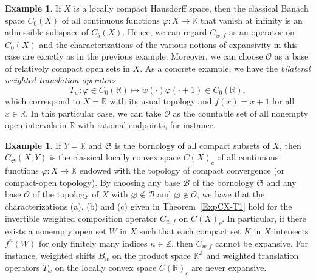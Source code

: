 \documentclass[12pt]{article}
\theoremstyle{plain}
\theoremstyle{definition}
\newtheorem{example}[theorem]{Example}%
\newcommand{\Z}{\mathbb{Z}} %
\newcommand{\R}{\mathbb{R}} %
\newcommand{\K}{\mathbb{K}} %
\newcommand{\cB}{\mathcal{B}}
\newcommand{\cO}{\mathcal{O}}
\newcommand{\fS}{\mathfrak{S}}
\begin{document}
\begin{example}\label{ExpCX-Ex2}
If $X$ is a locally compact Hausdorff space, then the classical Banach space $C_0(X)$ of all continuous functions 
$\varphi : X \to \K$ that vanish at infinity is an admissible subspace of $C_b(X)$.
Hence, we can regard $C_{w,f}$ as an operator on $C_0(X)$ and the characterizations of the various notions of expansivity
in this case are exactly as in the previous example. 
Moreover, we can choose $\cO$ as a base of relatively compact open sets in $X$.
As a concrete example, we have the {\em bilateral weighted translation operators}
\[
T_w : \varphi \in C_0(\R) \mapsto w(\cdot) \varphi(\cdot + 1) \in C_0(\R),
\]
which correspond to $X = \R$ with its usual topology and $f(x) = x+1$ for all $x \in \R$.
In this particular case, we can take $\cO$ as the countable set of all nonempty open intervals in $\R$ with rational endpoints, for instance.
\end{example}

\begin{example}\label{ExpCX-Ex3}
If $Y = \K$ and $\fS$ is the bornology of all compact subsets of $X$, then $C_\fS(X;Y)$ is the classical locally convex space 
$C(X)_c$ of all continuous functions $\varphi : X \to \K$ endowed with the topology of compact convergence (or compact-open topology).
By choosing any base $\cB$ of the bornology $\fS$ and any base $\cO$ of the topology of $X$
with $\varnothing \not\in \cB$ and $\varnothing \not\in \cO$, 
we have that the characterizations (a), (b) and (c) given in Theorem~\ref{ExpCX-T1} 
hold for the invertible weighted composition operator $C_{w,f}$ on $C(X)_c$.
In particular, if there exists a nonempty open set $W$ in $X$ such that each compact set $K$ in $X$ intersects $f^n(W)$
for only finitely many indices $n \in \Z$, then $C_{w,f}$ cannot be expansive. 
For instance, weighted shifts $B_w$ on the product space $\K^\Z$ and weighted translation operators $T_w$
on the locally convex space $C(\R)_c$ are never expansive. 
\end{example}
\end{document}
